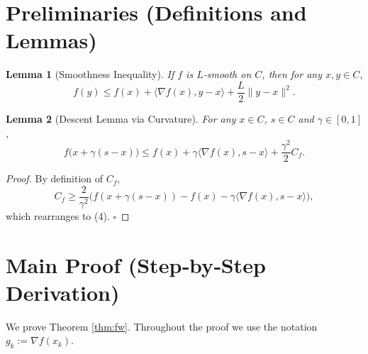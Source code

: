 \documentclass{article}
\newtheorem{lemma}{Lemma}
\newcommand{\inner}[2]{\langle #1,#2\rangle}
\begin{document}
\newpage
\section*{Preliminaries (Definitions and Lemmas)}
\begin{lemma}[Smoothness Inequality]\label{lem:smooth}
If $f$ is $L$‑smooth on $C$, then for any $x,y\in C$,
\[
f(y)\le f(x)+\inner{\nabla f(x)}{y-x}+\frac{L}{2}\|y-x\|^{2}.
\]
\end{lemma}
\begin{lemma}[Descent Lemma via Curvature]\label{lem:curv}
For any $x\in C$, $s\in C$ and $\gamma\in[0,1]$,
\[
f\bigl(x+\gamma(s-x)\bigr)\le f(x)+\gamma\inner{\nabla f(x)}{s-x}+\frac{\gamma^{2}}{2}C_{f}.
\tag{4}
\]
\end{lemma}
\begin{proof}
By definition of $C_{f}$,
\[
C_{f}\ge\frac{2}{\gamma^{2}}\bigl(f(x+\gamma(s-x))-f(x)-\gamma\inner{\nabla f(x)}{s-x}\bigr),
\]
which rearranges to (4). \hfill $\square$
\end{proof}

\section*{Main Proof (Step‑by‑Step Derivation)}
We prove Theorem \ref{thm:fw}.  Throughout the proof we use the notation $g_{k}:=\nabla f(x_{k})$.
\end{document}
